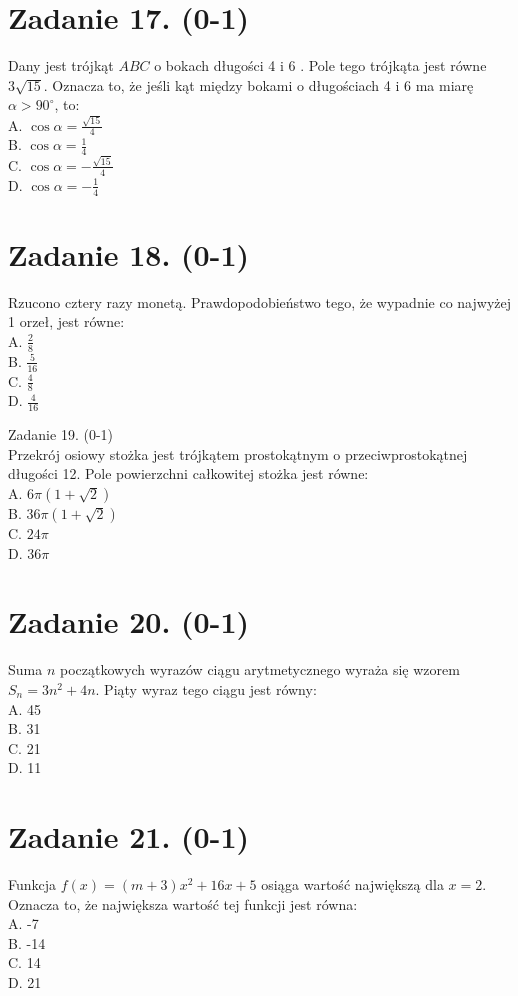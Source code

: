 \documentclass[10pt]{article}
\begin{document}
\section*{Zadanie 17. (0-1)}
Dany jest trójkąt \(A B C\) o bokach długości 4 i 6 . Pole tego trójkąta jest równe \(3 \sqrt{15}\). Oznacza to, że jeśli kąt między bokami o długościach 4 i 6 ma miarę \(\alpha>90^{\circ}\), to:\\
A. \(\cos \alpha=\frac{\sqrt{15}}{4}\)\\
B. \(\cos \alpha=\frac{1}{4}\)\\
C. \(\cos \alpha=-\frac{\sqrt{15}}{4}\)\\
D. \(\cos \alpha=-\frac{1}{4}\)

\section*{Zadanie 18. (0-1)}
Rzucono cztery razy monetą. Prawdopodobieństwo tego, że wypadnie co najwyżej 1 orzeł, jest równe:\\
A. \(\frac{2}{8}\)\\
B. \(\frac{5}{16}\)\\
C. \(\frac{4}{8}\)\\
D. \(\frac{4}{16}\)

Zadanie 19. (0-1)\\
Przekrój osiowy stożka jest trójkątem prostokątnym o przeciwprostokątnej długości 12. Pole powierzchni całkowitej stożka jest równe:\\
A. \(6 \pi(1+\sqrt{2})\)\\
B. \(36 \pi(1+\sqrt{2})\)\\
C. \(24 \pi\)\\
D. \(36 \pi\)

\section*{Zadanie 20. (0-1)}
Suma \(n\) początkowych wyrazów ciągu arytmetycznego wyraża się wzorem \(S_{n}=3 n^{2}+4 n\). Piąty wyraz tego ciągu jest równy:\\
A. 45\\
B. 31\\
C. 21\\
D. 11

\section*{Zadanie 21. (0-1)}
Funkcja \(f(x)=(m+3) x^{2}+16 x+5\) osiąga wartość największą dla \(x=2\). Oznacza to, że największa wartość tej funkcji jest równa:\\
A. -7\\
B. -14\\
C. 14\\
D. 21
\end{document}
